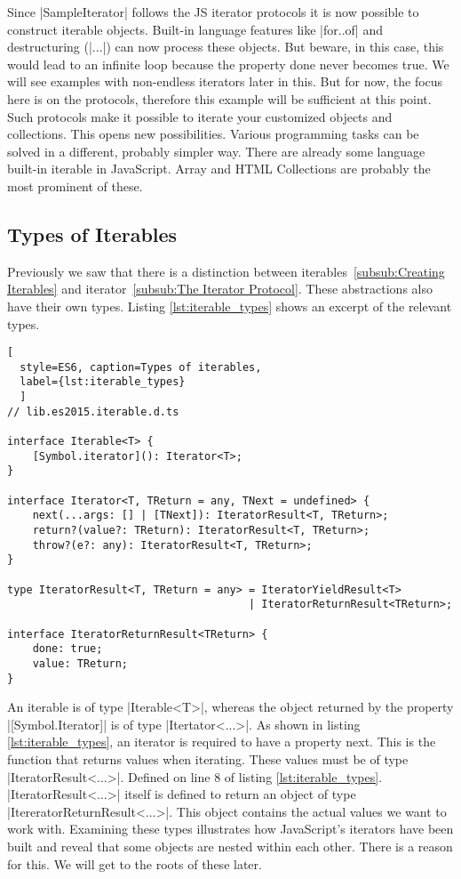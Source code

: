 Since |SampleIterator| follows the JS iterator protocols it is now possible to
construct iterable objects.
Built-in language features like |for..of| and destructuring (|...|) can now process these objects. 
But beware, in this case, this would lead to an infinite loop because the 
property done never becomes true. We will see examples with non-endless iterators 
later in this. But for now, the focus here is on the protocols, therefore this 
example will be sufficient at this point.
\newline
Such protocols make it possible to iterate your customized objects and
collections. This opens new possibilities. Various programming tasks can be 
solved in a different, probably simpler way.
\newline
There are already some language built-in iterable in JavaScript. Array and
HTML Collections are probably the most prominent of these.

\subsection{Types of Iterables}
\label{sub:Types of Iterables}
Previously we saw that there is a distinction between iterables~\ref{subsub:Creating Iterables} 
and iterator~\ref{subsub:The Iterator Protocol}. These abstractions also have their own types. 
Listing \ref{lst:iterable_types}  shows an excerpt of the relevant types.

\begin{lstlisting}[
  style=ES6, caption=Types of iterables,
  label={lst:iterable_types}
  ]
// lib.es2015.iterable.d.ts

interface Iterable<T> {
    [Symbol.iterator](): Iterator<T>;
}

interface Iterator<T, TReturn = any, TNext = undefined> {
    next(...args: [] | [TNext]): IteratorResult<T, TReturn>;
    return?(value?: TReturn): IteratorResult<T, TReturn>;
    throw?(e?: any): IteratorResult<T, TReturn>;
}

type IteratorResult<T, TReturn = any> = IteratorYieldResult<T> 
                                      | IteratorReturnResult<TReturn>;

interface IteratorReturnResult<TReturn> {
    done: true;
    value: TReturn;
}
\end{lstlisting}

An iterable is of type |Iterable<T>|, whereas the object returned by the property
|[Symbol.Iterator]| is of type |Itertator<...>|. As shown in listing
\ref{lst:iterable_types}, an iterator is required to have a property next. 
This is the function that returns values when iterating. These values must be 
of type |IteratorResult<...>|. Defined on line 8 of listing 
\ref{lst:iterable_types}. |IteratorResult<...>| itself is defined to return an 
object of type |ItereratorReturnResult<...>|. This object contains the actual 
values we want to work with. Examining these types illustrates how JavaScript's 
iterators have been built and reveal that some objects are nested within each
other. There is a reason for this. We will get to the roots of these later.


